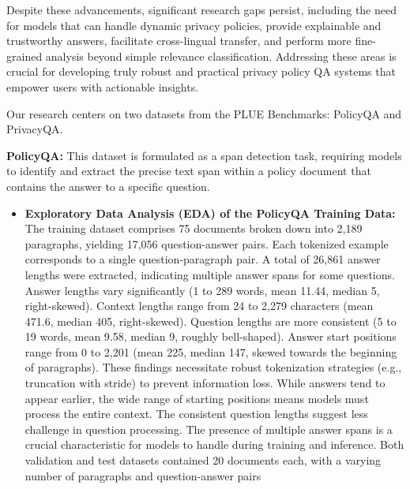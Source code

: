 \documentclass[11pt]{article}
\begin{document}
Despite these advancements, significant research gaps persist, including the need for models that can handle dynamic privacy policies, provide explainable and trustworthy answers, facilitate cross-lingual transfer, and perform more fine-grained analysis beyond simple relevance classification. Addressing these areas is crucial for developing truly robust and practical privacy policy QA systems that empower users with actionable insights.

Our research centers on two datasets from the PLUE Benchmarks: PolicyQA and PrivacyQA. 

\textbf{PolicyQA:} This dataset is formulated as a span detection task, requiring models to identify and extract the precise text span within a policy document that contains the answer to a specific question.
\begin{itemize}
    \item \textbf{Exploratory Data Analysis (EDA) of the PolicyQA Training Data:} The training dataset comprises 75 documents broken down into 2,189 paragraphs, yielding 17,056 question-answer pairs. Each tokenized example corresponds to a single question-paragraph pair. A total of 26,861 answer lengths were extracted, indicating multiple answer spans for some questions. Answer lengths vary significantly (1 to 289 words, mean 11.44, median 5, right-skewed). Context lengths range from 24 to 2,279 characters (mean 471.6, median 405, right-skewed). Question lengths are more consistent (5 to 19 words, mean 9.58, median 9, roughly bell-shaped). Answer start positions range from 0 to 2,201 (mean 225, median 147, skewed towards the beginning of paragraphs). These findings necessitate robust tokenization strategies (e.g., truncation with stride) to prevent information loss. While answers tend to appear earlier, the wide range of starting positions means models must process the entire context. The consistent question lengths suggest less challenge in question processing. The presence of multiple answer spans is a crucial characteristic for models to handle during training and inference. Both validation and test datasets contained 20 documents each, with a varying number of paragraphs and question-answer pairs
\end{itemize}
\end{document}
